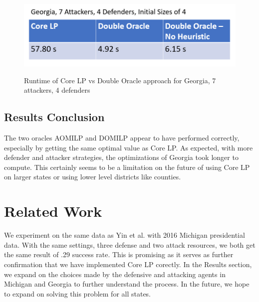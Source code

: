 \documentclass[letterpaper]{article} %
\begin{document}
\begin{figure}
    \includegraphics[width=\linewidth]{timingdifferences}
    \label{timingdifferences}
    \caption{Runtime of Core LP vs Double Oracle approach for Georgia, 7 attackers, 4 defenders}
\end{figure}

\subsection{Results Conclusion}

The two oracles AOMILP and DOMILP appear to have performed correctly, especially by getting the same optimal value as Core LP. As expected, with more defender and attacker strategies, the optimizations of Georgia took longer to compute. This certainly seems to be a limitation on the future of using Core LP on larger states or using lower level districts like counties.


\section{Related Work}

We experiment on the same data as Yin et al. with 2016 Michigan presidential data. With the same settings, three defense and two attack resources, we both get the same result of .29 success rate. This is promising as it serves as further confirmation that we have implemented Core LP corectly. In the Results section, we expand on the choices made by the defensive and attacking agents in Michigan and Georgia to further understand the process. In the future, we hope to expand on solving this problem for all states. 
\end{document}
